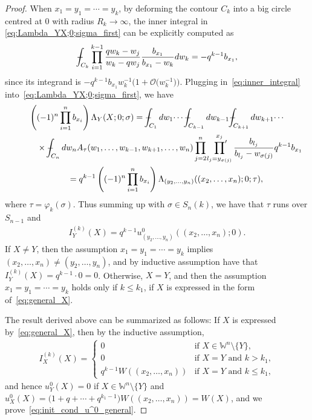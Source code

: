 \documentclass[pdftex]{sigma}
\numberwithin{equation}{section}
\def\Xint#1{\mathchoice
{\XXint\displaystyle\textstyle{#1}}%
{\XXint\textstyle\scriptstyle{#1}}%
{\XXint\scriptstyle\scriptscriptstyle{#1}}%
{\XXint\scriptscriptstyle\scriptscriptstyle{#1}}%
\!\int}
\def\XXint#1#2#3{{\setbox0=\hbox{$#1{#2#3}{\int}$}
\vcenter{\hbox{$#2#3$}}\kern-.5\wd0}}
\def\dashint{\Xint-}
\newcommand{\prodprime}{\sideset{}{'}\prod}
\newcommand{\Weylchamber}{\mathbb{W}}
\newcommand{\bigO}{\mathcal{O}}
\begin{document}
\begin{proof}
 When $x_1 = y_1 = \dotsb = y_k$, by deforming the contour $C_k$ into a big circle centred at $0$ with radius $R_k \to \infty$, the inner integral in \eqref{eq:Lambda_YX;0;sigma_first} can be explicitly computed as
 \begin{gather} \label{eq:inner_integral}
 \dashint_{C_k} \prod^{k - 1}_{i = 1} \frac{q w_k - w_j}{w_k - q w_j} \frac{b_{x_1}}{b_{x_1} - w_k} dw_k = -q^{k - 1} b_{x_1},
 \end{gather}
 since its integrand is $-q^{k - 1} b_{x_1} w^{-1}_k \big(1 + \bigO\big(w^{-1}_k\big)\big)$. Plugging in~\eqref{eq:inner_integral} into~\eqref{eq:Lambda_YX;0;sigma_first}, we have
 \begin{gather}
   \left( (-1)^n \prod^n_{i = 1} b_{x_i} \right) \Lambda_Y(X; 0; \sigma)
 =  \dashint_{C_1} dw_1 \dotsi \dashint_{C_{k - 1}} dw_{k - 1} \dashint_{C_{k + 1}} dw_{k + 1} \dotsi \nonumber\\
 \qquad\quad{}\times \dashint_{C_n} dw_n A_{\tau}(w_1, \dotsc, w_{k - 1}, w_{k + 1}, \dotsc, w_n)  \prod^n_{j = 2} \prodprime^{x_j}_{l_j = y_{\sigma(j)}} \frac{b_{l_j}}{b_{l_j} - w_{\sigma(j)}} q^{k - 1} b_{x_1} \nonumber\\
\qquad{}
 =  q^{k - 1} \left( (-1)^n \prod^n_{i = 1} b_{x_i} \right) \Lambda_{(y_2, \dotsc, y_n)}((x_2, \dotsc, x_n); 0; \tau),\label{eq:evanluation_x_1=y_k}
  \end{gather}
 where $\tau = \varphi_k(\sigma)$. Thus summing up with $\sigma \in S_n(k)$, we have that $\tau$ runs over $S_{n - 1}$ and
 \begin{gather*} %
 I^{(k)}_Y(X) = q^{k - 1} u^0_{(y_2, \dotsc, y_n)}((x_2, \dotsc, x_n); 0).
 \end{gather*}
 If $X \neq Y$, then the assumption $x_1 = y_1 = \dotsb = y_k$ implies $(x_2, \dotsc, x_n) \neq (y_2, \dotsc, y_n)$, and by inductive assumption have that $I^{(k)}_Y(X) = q^{k - 1} \cdot 0 = 0$. Otherwise, $X = Y$, and then the assumption $x_1 = y_1 = \dotsb = y_k$ holds only if $k \leq k_1$, if $X$ is expressed in the form of~\eqref{eq:general_X}.

 The result derived above can be summarized as follows: If $X$ is expressed by~\eqref{eq:general_X}, then by the inductive assumption,
 \begin{gather*}
 I^{(k)}_X(X) =
 \begin{cases}
 0 & \text{if $X \in \Weylchamber^n {\setminus} \{ Y \}$}, \\
 0 & \text{if $X = Y$ and $k > k_1$}, \\
 q^{k - 1} W((x_2, \dotsc, x_n)) & \text{if $X = Y$ and $k \leq k_1$},
 \end{cases}
 \end{gather*}
 and hence $u^0_Y(X) = 0$ if $X \in \Weylchamber^n {\setminus} \{ Y \}$ and $u^0_X(X) = \big(1 + q + \dotsb + q^{k_1 - 1}\big) W((x_2, \dotsc, x_n)) = W(X)$, and we prove~\eqref{eq:init_cond_u^0_general}.
\end{proof}
\end{document}
